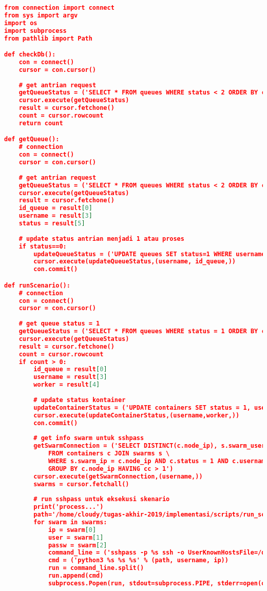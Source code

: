 \begin{lstlisting}[frame=single,tabsize=2,breaklines,caption={Isi berkas queue.py},label=queuepy, captionpos=b, language=json]
from connection import connect
from sys import argv
import os
import subprocess
from pathlib import Path

def checkDb():
	con = connect()
	cursor = con.cursor()
	
	# get antrian request
	getQueueStatus = ('SELECT * FROM queues WHERE status < 2 ORDER BY created_at LIMIT 1')
	cursor.execute(getQueueStatus)
	result = cursor.fetchone()
	count = cursor.rowcount
	return count

def getQueue():
	# connection
	con = connect()
	cursor = con.cursor()
	
	# get antrian request
	getQueueStatus = ('SELECT * FROM queues WHERE status < 2 ORDER BY created_at LIMIT 1')
	cursor.execute(getQueueStatus)
	result = cursor.fetchone()
	id_queue = result[0]
	username = result[3]
	status = result[5]
	
	# update status antrian menjadi 1 atau proses
	if status==0:
		updateQueueStatus = ('UPDATE queues SET status=1 WHERE username=%s AND id=%s')
		cursor.execute(updateQueueStatus,(username, id_queue,))
		con.commit()

def runScenario():
	# connection
	con = connect()
	cursor = con.cursor()
	
	# get queue status = 1
	getQueueStatus = ('SELECT * FROM queues WHERE status = 1 ORDER BY created_at LIMIT 1')
	cursor.execute(getQueueStatus)
	result = cursor.fetchone()
	count = cursor.rowcount
	if count > 0:
		id_queue = result[0]
		username = result[3]
		worker = result[4]
		
		# update status kontainer
		updateContainerStatus = ('UPDATE containers SET status = 1, username = %s WHERE status = 0 LIMIT %s')
		cursor.execute(updateContainerStatus,(username,worker,))
		con.commit()
		
		# get info swarm untuk sshpass
		getSwarmConnection = ('SELECT DISTINCT(c.node_ip), s.swarm_username, s.swarm_password, c.username,COUNT(c.node_ip) cc \
			FROM containers c JOIN swarms s \
			WHERE s.swarm_ip = c.node_ip AND c.status = 1 AND c.username = %s \
			GROUP BY c.node_ip HAVING cc > 1')
		cursor.execute(getSwarmConnection,(username,))
		swarms = cursor.fetchall()
		
		# run sshpass untuk eksekusi skenario
		print('process...')
		path='/home/cloudy/tugas-akhir-2019/implementasi/scripts/run_scenario.py'
		for swarm in swarms:
			ip = swarm[0]
			user = swarm[1]
			passw = swarm[2]
			command_line = ('sshpass -p %s ssh -o UserKnownHostsFile=/dev/null -o StrictHostKeyChecking=no %s@%s' % (passw, user, ip))
			cmd = ('python3 %s %s %s' % (path, username, ip))
			run = command_line.split()
			run.append(cmd)
			subprocess.Popen(run, stdout=subprocess.PIPE, stderr=open(os.devnull, 'w'))
		

\end{lstlisting}
